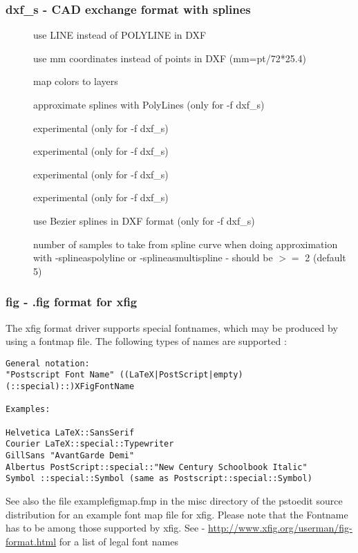 \documentclass[english,a4paper]{article}
\let\URL\url \let\Email\url \let\File\url
\begin{document}
\subsubsection{dxf\_s - CAD exchange format with splines}
\begin{description}
\item[] 
use LINE instead of POLYLINE in DXF


\item[] 
use mm coordinates instead of points in DXF (mm=pt/72*25.4)


\item[] 
map colors to layers


\item[] 
approximate splines with PolyLines (only for -f dxf\_s)


\item[] 
experimental (only for -f dxf\_s)


\item[] 
experimental (only for -f dxf\_s)


\item[] 
experimental (only for -f dxf\_s)


\item[] 
experimental (only for -f dxf\_s)


\item[] 
use Bezier splines in DXF format (only for -f dxf\_s)


\item[] 
number of samples to take from spline curve when doing approximation with -splineaspolyline or -splineasmultispline - should be $>=$ 2 (default 5)


\end{description}
\subsubsection{fig - .fig format for xfig}
The xfig format driver supports special fontnames, which may be produced by using a fontmap file. The following types of names are supported : \\  
\begin{verbatim}
General notation: 
"Postscript Font Name" ((LaTeX|PostScript|empty)(::special)::)XFigFontName
 
Examples:

Helvetica LaTeX::SansSerif
Courier LaTeX::special::Typewriter
GillSans "AvantGarde Demi"
Albertus PostScript::special::"New Century Schoolbook Italic" 
Symbol ::special::Symbol (same as Postscript::special::Symbol)
\end{verbatim}
See also the file examplefigmap.fmp in the misc directory of the pstoedit source distribution for an example font map file for xfig. Please note that the Fontname has to be among those supported by xfig. See - \URL{http://www.xfig.org/userman/fig-format.html} for a list of legal font names
\end{document}
